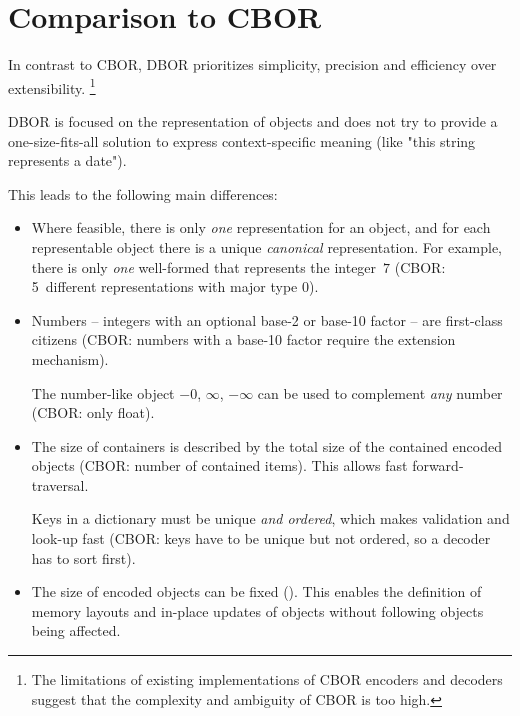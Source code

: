 
\section{Comparison to CBOR}
\label{sec:comparisontocbor}

In contrast to CBOR, DBOR prioritizes simplicity, precision and efficiency over extensibility.%
\footnote{%
    The limitations of existing implementations of CBOR encoders and decoders suggest
    that the complexity and ambiguity of CBOR is too high.
}

DBOR is focused on the representation of objects and does not try to provide a one-size-fits-all solution
to express context-specific meaning (like "this string represents a date").

\medskip
\begin{BeginParPenalty}
    This leads to the following main differences:
    \begin{itemize}
        \item
        Where feasible, there is only \emph{one} representation for an object,
        and for each representable object there is a unique \emph{canonical} representation.
        For example, there is only \emph{one} well-formed \DborIntegerValue{} that represents the integer~$7$
        (CBOR: 5~different representations with major type 0).

        \item
        Numbers -- integers with an optional base-2 or base-10 factor -- are first-class citizens
        (CBOR: numbers with a base-10 factor require the extension mechanism).

        The number-like object $-0$, $\infty$, $-\infty$ can be used to complement \emph{any} number
        (CBOR: only float).

        \item
        The size of containers is described by the total size of the contained encoded objects
        (CBOR: number of contained items).
        This allows fast forward-traversal.

        Keys in a dictionary must be unique \emph{and ordered}, which makes validation and look-up fast
        (CBOR: keys have to be unique but not ordered, so a decoder has to sort first).

        \item
        The size of encoded objects can be fixed (\DborAllocatorValue).
        This enables the definition of memory layouts and in-place updates of objects without
        following objects being affected.
    \end{itemize}
\end{BeginParPenalty}

